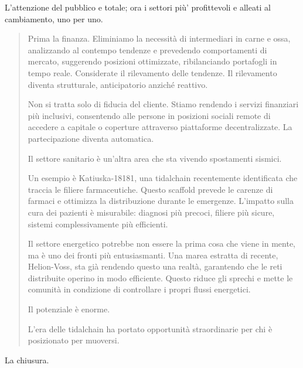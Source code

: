 L'attenzione del pubblico e totale; ora i settori più' profittevoli e alleati al cambiamento, uno per uno.

\begin{quote}
Prima la finanza. Eliminiamo la necessità di intermediari in carne e ossa, analizzando al contempo tendenze e prevedendo comportamenti di mercato, suggerendo posizioni ottimizzate, ribilanciando portafogli in tempo reale. Considerate il rilevamento delle tendenze. Il rilevamento diventa strutturale, anticipatorio anziché reattivo.

Non si tratta solo di fiducia del cliente. Stiamo rendendo i servizi finanziari più inclusivi, consentendo alle persone in posizioni sociali remote di accedere a capitale o coperture attraverso piattaforme decentralizzate. La partecipazione diventa automatica.

Il settore sanitario è un'altra area che sta vivendo spostamenti sismici.

Un esempio è Katiuska-18181, una tidalchain recentemente identificata che traccia le filiere farmaceutiche. Questo scaffold prevede le carenze di farmaci e ottimizza la distribuzione durante le emergenze. L'impatto sulla cura dei pazienti è misurabile: diagnosi più precoci, filiere più sicure, sistemi complessivamente più efficienti.

Il settore energetico potrebbe non essere la prima cosa che viene in mente, ma è uno dei fronti più entusiasmanti. Una marea estratta di recente, Helion-Voss, sta già rendendo questo una realtà, garantendo che le reti distribuite operino in modo efficiente. Questo riduce gli sprechi e mette le comunità in condizione di controllare i propri flussi energetici. 

Il potenziale è enorme.

L'era delle tidalchain ha portato opportunità straordinarie per chi è posizionato per muoversi.

\end{quote}


La chiusura.


